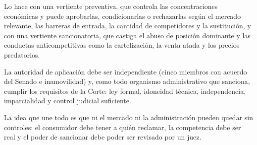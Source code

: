 \documentclass[12pt,oneside]{book}
\begin{document}
Lo hace con una vertiente preventiva, que controla las concentraciones económicas y puede aprobarlas, condicionarlas o rechazarlas según el mercado relevante, las barreras de entrada, la cantidad de competidores y la sustitución, y con una vertiente sancionatoria, que castiga el abuso de posición dominante y las conductas anticompetitivas como la cartelización, la venta atada y los precios predatorios.

La autoridad de aplicación debe ser independiente (cinco miembros con acuerdo del Senado e inamovilidad) y, como todo organismo administrativo que sanciona, cumplir los requisitos de la Corte: ley formal, idoneidad técnica, independencia, imparcialidad y control judicial suficiente.

La idea que une todo es que ni el mercado ni la administración pueden quedar sin controles: el consumidor debe tener a quién reclamar, la competencia debe ser real y el poder de sancionar debe poder ser revisado por un juez.
\end{document}
